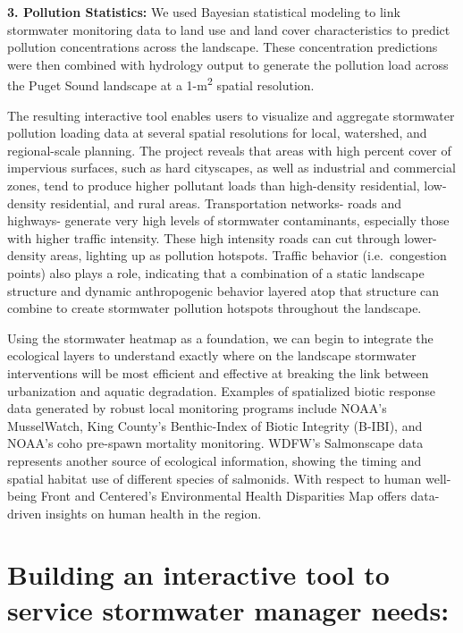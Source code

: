 \documentclass[
]{report}
\begin{document}
\textbf{3. Pollution Statistics:} We used Bayesian statistical modeling to link stormwater monitoring data to land use and land cover characteristics to predict pollution concentrations across the landscape. These concentration predictions were then combined with hydrology output to generate the pollution load across the Puget Sound landscape at a 1-m\textsuperscript{2} spatial resolution.

The resulting interactive tool enables users to visualize and aggregate stormwater pollution loading data at several spatial resolutions for local, watershed, and regional-scale planning. The project reveals that areas with high percent cover of impervious surfaces, such as hard cityscapes, as well as industrial and commercial zones, tend to produce higher pollutant loads than high-density residential, low-density residential, and rural areas. Transportation networks- roads and highways- generate very high levels of stormwater contaminants, especially those with higher traffic intensity. These high intensity roads can cut through lower-density areas, lighting up as pollution hotspots. Traffic behavior (i.e.~congestion points) also plays a role, indicating that a combination of a static landscape structure and dynamic anthropogenic behavior layered atop that structure can combine to create stormwater pollution hotspots throughout the landscape.

Using the stormwater heatmap as a foundation, we can begin to integrate the ecological layers to understand exactly where on the landscape stormwater interventions will be most efficient and effective at breaking the link between urbanization and aquatic degradation. Examples of spatialized biotic response data generated by robust local monitoring programs include NOAA's MusselWatch, King County's Benthic-Index of Biotic Integrity (B-IBI), and NOAA's coho pre-spawn mortality monitoring. WDFW's Salmonscape data represents another source of ecological information, showing the timing and spatial habitat use of different species of salmonids. With respect to human well-being Front and Centered's Environmental Health Disparities Map offers data-driven insights on human health in the region.

\hypertarget{building-an-interactive-tool-to-service-stormwater-manager-needs}{%
\section{Building an interactive tool to service stormwater manager needs:}\label{building-an-interactive-tool-to-service-stormwater-manager-needs}}
\end{document}
